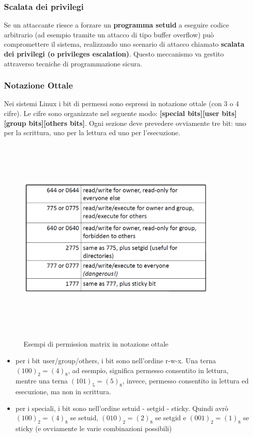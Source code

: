 \subsubsection{Scalata dei privilegi}
Se un attaccante riesce a forzare un \textbf{programma setuid} a eseguire codice arbitrario (ad esempio tramite un attacco di tipo buffer overflow) può compromettere il sistema, realizzando uno scenario di attacco chiamato \textbf{scalata dei privilegi (o privileges escalation)}. Questo meccanismo va gestito attraverso tecniche di programmazione sicura.

\subsubsection{Notazione Ottale}
Nei sistemi Linux i bit di permessi sono espressi in notazione ottale (con 3 o 4 cifre). Le cifre sono organizzate nel seguente modo: \newline
\textbf{[special bits][user bits][group bits][others bits]}. Ogni sezione deve prevedere ovviamente tre bit: uno per la scrittura, uno per la lettura ed uno per l'esecuzione. 

\begin{figure}[htbp]
	\centering%
	\subfigure%
	{\includegraphics[height=10cm, width=10cm, keepaspectratio]{Immagini/sistemi_operativi/notazione_ottale.png}}
	\caption{Esempi di permission matrix in notazione ottale\label{fig:notazione_ottale}} 	
\end{figure}
\begin{itemize}
  \item per i bit user/group/others, i bit sono nell'ordine r-w-x. Una terna $(100)_{2} = (4)_{8}$, ad esempio, significa permesso consentito in lettura, mentre una terna $(101)_{5} = (5)_{8}$, invece, permesso consentito in lettura ed esecuzione, ma non in scrittura.
  \item per i speciali, i bit sono nell'ordine setuid - setgid - sticky. Quindi avrò $(100)_{2} = (4)_{8}$ se setuid, $(010)_{2} = (2)_{8}$ se setgid e $(001)_{2} = (1)_{8}$ se sticky (e ovviamente le varie combinazioni possibili)
\end{itemize}

